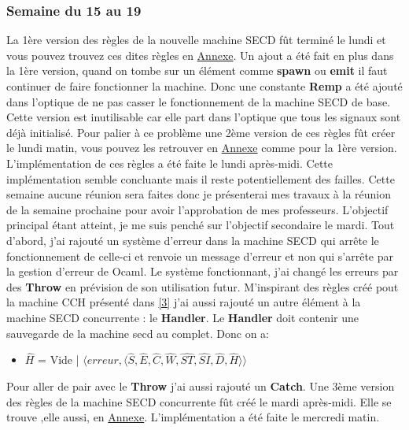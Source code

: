 \documentclass[10pt,a4paper]{article}
\begin{document}
		\subsubsection{Semaine du 15 au 19}
		La 1ère version des règles de la nouvelle machine SECD fût terminé le lundi et vous pouvez trouvez ces dites règles en \hyperref[SECDConc1]{Annexe}. 
		Un ajout a été fait en plus dans la 1ère version, quand on tombe sur un élément comme \textbf{spawn} ou  \textbf{emit} il faut continuer de faire fonctionner la machine. Donc une constante \textbf{Remp} a été ajouté dans l'optique de ne pas casser le fonctionnement de la machine SECD de base.
		\\ Cette version est inutilisable car elle part dans l'optique que tous les signaux sont déjà initialisé.
		\smallbreak
		Pour palier à ce problème une 2ème version de ces règles fût créer le lundi matin, vous pouvez les retrouver en \hyperref[SECDConc2]{Annexe} comme pour la 1ère version.
		\medbreak
		L'implémentation de ces règles a été faite le lundi après-midi. Cette implémentation semble concluante mais il reste potentiellement des failles. Cette semaine aucune réunion sera faites donc je présenterai mes travaux à la réunion de la semaine prochaine pour avoir l'approbation de mes professeurs.
		\smallbreak
		L'objectif principal étant atteint, je me suis penché sur l'objectif secondaire le mardi. 
		\smallbreak
		Tout d'abord, j'ai rajouté un système d'erreur dans la machine SECD qui arrête le fonctionnement de celle-ci et renvoie un message d'erreur et non qui s'arrête par la gestion d'erreur de Ocaml. Le système fonctionnant, j'ai changé les erreurs par des \textbf{Throw} en prévision de son utilisation futur. M'inspirant des règles créé pout la machine CCH présenté dans \hyperref[Calculi]{[3]} j'ai aussi rajouté un autre élément à la machine SECD concurrente : le \textbf{Handler}. Le \textbf{Handler} doit contenir une sauvegarde de la machine secd au complet. Donc on a:
		
		\begin{itemize}
			\item[] $\widehat{H}$ = Vide | $\langle erreur,\langle\widehat{S},\widehat{E},\widehat{C},\widehat{W},\widehat{ST},\widehat{SI},\widehat{D},\widehat{H}\rangle\rangle$
		\end{itemize}
		\smallbreak
		
		Pour aller de pair avec le \textbf{Throw} j'ai aussi rajouté un \textbf{Catch}.
		Une 3ème version des règles de la machine SECD concurrente fût créé le mardi après-midi. Elle se trouve ,elle aussi, en \hyperref[SECDConc3]{Annexe}. L'implémentation a été faite le mercredi matin.
		\medbreak
		
\end{document}
